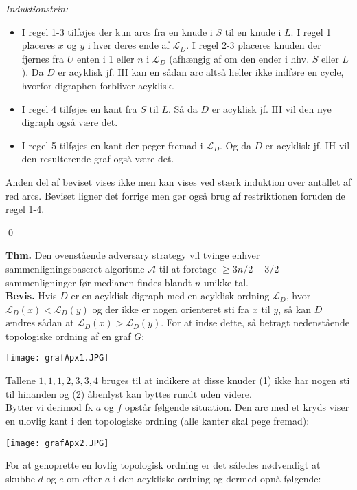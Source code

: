 \textit{Induktionstrin:} 
\begin{itemize}
	\item I regel 1-3 tilføjes der kun arcs fra en knude i $S$ til en knude i $L$. I regel 1 placeres $x$ og $y$ i hver deres ende af $\mathcal{L}_D$. I regel 2-3 placeres knuden der fjernes fra $U$ enten i 1 eller $n$ i $\mathcal{L}_D$ (afhængig af om den ender i hhv. $S$ eller $L$ ). Da $D$ er acyklisk jf. IH kan en sådan arc altså heller ikke indføre en cycle, hvorfor digraphen forbliver acyklisk.
	\item I regel 4 tilføjes en kant fra $S$ til $L$. Så da $D$ er acyklisk jf. IH vil den nye digraph også være det. 
	\item I regel 5 tilføjes en kant der peger fremad i $\mathcal{L}_D$. Og da $D$ er acyklisk jf. IH vil den resulterende graf også være det.  
\end{itemize}
Anden del af beviset vises ikke men kan vises ved stærk induktion over antallet af red arcs. Beviset ligner det forrige men gør også brug af restriktionen foruden de regel 1-4. 
\begin{flushright}
	\qed
\end{flushright}

\textbf{Thm.} Den ovenstående adversary strategy vil tvinge enhver sammenligningsbaseret algoritme $\mathcal{A}$ til at foretage $\ge 3n/2-3/2$ sammenligninger før medianen findes blandt $n$ unikke tal. \\

\textbf{Bevis.} Hvis $D$ er en acyklisk digraph med en acyklisk ordning $\mathcal{L}_D$, hvor $\mathcal{L}_D(x)<\mathcal{L}_D(y)$ og der ikke er nogen orienteret sti fra $x$ til $y$, så kan $D$ ændres sådan at $\mathcal{L}_D(x)>\mathcal{L}_D(y)$. For at indse dette, så betragt nedenstående topologiske ordning af en graf $G$:
\begin{center}
	\texttt{[image: grafApx1.JPG]}
\end{center}
Tallene $1,1,1,2,3,3,4$ bruges til at indikere at disse knuder (1) ikke har nogen sti til hinanden og (2) åbenlyst kan byttes rundt uden videre. \\

Bytter vi derimod fx $a$ og $f$ opstår følgende situation. Den arc med et kryds viser en ulovlig kant i den topologiske ordning (alle kanter skal pege fremad):
\begin{center}
	\texttt{[image: grafApx2.JPG]}
\end{center}
For at genoprette en lovlig topologisk ordning er det således nødvendigt at skubbe $d$ og $e$ om efter $a$ i den acykliske ordning og dermed opnå følgende: 

